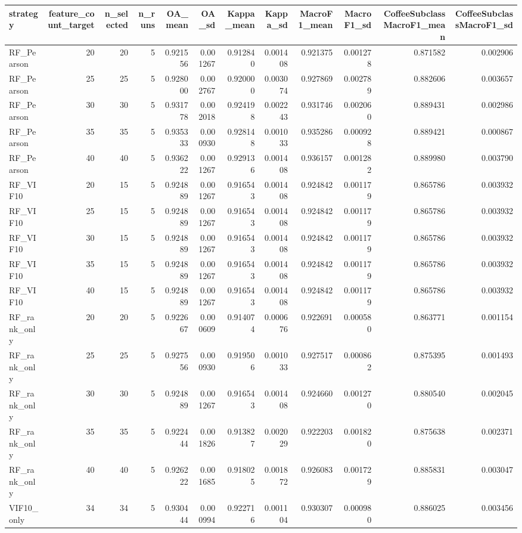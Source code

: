 \begin{tabular}{lrrrrrrrrrrr}
\toprule
strategy & feature_count_target & n_selected & n_runs & OA_mean & OA_sd & Kappa_mean & Kappa_sd & MacroF1_mean & MacroF1_sd & CoffeeSubclassMacroF1_mean & CoffeeSubclassMacroF1_sd \\
\midrule
RF_Pearson & 20 & 20 & 5 & 0.921556 & 0.001267 & 0.912840 & 0.001408 & 0.921375 & 0.001278 & 0.871582 & 0.002906 \\
RF_Pearson & 25 & 25 & 5 & 0.928000 & 0.002767 & 0.920000 & 0.003074 & 0.927869 & 0.002789 & 0.882606 & 0.003657 \\
RF_Pearson & 30 & 30 & 5 & 0.931778 & 0.002018 & 0.924198 & 0.002243 & 0.931746 & 0.002060 & 0.889431 & 0.002986 \\
RF_Pearson & 35 & 35 & 5 & 0.935333 & 0.000930 & 0.928148 & 0.001033 & 0.935286 & 0.000928 & 0.889421 & 0.000867 \\
RF_Pearson & 40 & 40 & 5 & 0.936222 & 0.001267 & 0.929136 & 0.001408 & 0.936157 & 0.001282 & 0.889980 & 0.003790 \\
RF_VIF10 & 20 & 15 & 5 & 0.924889 & 0.001267 & 0.916543 & 0.001408 & 0.924842 & 0.001179 & 0.865786 & 0.003932 \\
RF_VIF10 & 25 & 15 & 5 & 0.924889 & 0.001267 & 0.916543 & 0.001408 & 0.924842 & 0.001179 & 0.865786 & 0.003932 \\
RF_VIF10 & 30 & 15 & 5 & 0.924889 & 0.001267 & 0.916543 & 0.001408 & 0.924842 & 0.001179 & 0.865786 & 0.003932 \\
RF_VIF10 & 35 & 15 & 5 & 0.924889 & 0.001267 & 0.916543 & 0.001408 & 0.924842 & 0.001179 & 0.865786 & 0.003932 \\
RF_VIF10 & 40 & 15 & 5 & 0.924889 & 0.001267 & 0.916543 & 0.001408 & 0.924842 & 0.001179 & 0.865786 & 0.003932 \\
RF_rank_only & 20 & 20 & 5 & 0.922667 & 0.000609 & 0.914074 & 0.000676 & 0.922691 & 0.000580 & 0.863771 & 0.001154 \\
RF_rank_only & 25 & 25 & 5 & 0.927556 & 0.000930 & 0.919506 & 0.001033 & 0.927517 & 0.000862 & 0.875395 & 0.001493 \\
RF_rank_only & 30 & 30 & 5 & 0.924889 & 0.001267 & 0.916543 & 0.001408 & 0.924660 & 0.001270 & 0.880540 & 0.002045 \\
RF_rank_only & 35 & 35 & 5 & 0.922444 & 0.001826 & 0.913827 & 0.002029 & 0.922203 & 0.001820 & 0.875638 & 0.002371 \\
RF_rank_only & 40 & 40 & 5 & 0.926222 & 0.001685 & 0.918025 & 0.001872 & 0.926083 & 0.001729 & 0.885831 & 0.003047 \\
VIF10_only & 34 & 34 & 5 & 0.930444 & 0.000994 & 0.922716 & 0.001104 & 0.930307 & 0.000980 & 0.886025 & 0.003456 \\
\bottomrule
\end{tabular}
